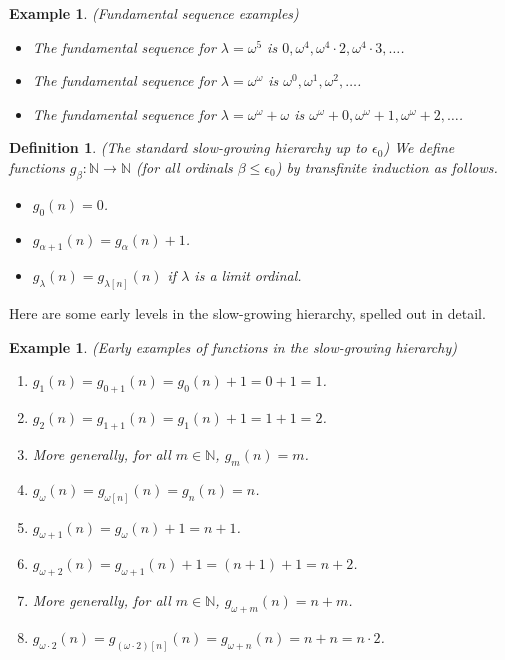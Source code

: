 \documentclass{article}
\newtheorem{definition}[theorem]{Definition}
\newtheorem{example}[theorem]{Example}
\begin{document}
\begin{example}
    (Fundamental sequence examples)
    \begin{itemize}
        \item
        The fundamental sequence for $\lambda=\omega^5$ is
        $0,\omega^4,\omega^4\cdot 2,\omega^4\cdot 3,\ldots$.
        \item
        The fundamental sequence for $\lambda=\omega^\omega$ is
        $\omega^0,\omega^1,\omega^2,\ldots$.
        \item
        The fundamental sequence for $\lambda=\omega^\omega+\omega$ is
        $\omega^\omega+0,\omega^\omega+1,\omega^\omega+2,\ldots$.
    \end{itemize}
\end{example}

\begin{definition}
\label{slowgrowinghierarchydefn}
    (The standard slow-growing hierarchy up to $\epsilon_0$)
    We define functions $g_\beta:\mathbb N\to\mathbb N$ (for all ordinals
    $\beta\leq \epsilon_0$) by transfinite induction as follows.
    \begin{itemize}
        \item
        $g_0(n)=0$.
        \item
        $g_{\alpha+1}(n) = g_\alpha(n) + 1$.
        \item
        $g_{\lambda}(n) = g_{\lambda[n]}(n)$ if $\lambda$ is a limit ordinal.
    \end{itemize}
\end{definition}

Here are some early levels in the slow-growing hierarchy, spelled out in detail.

\begin{example}
\label{highdetailslowgrowingexample}
    (Early examples of functions in the slow-growing hierarchy)
    \begin{enumerate}
        \item
        $g_1(n)=g_{0+1}(n)=g_0(n)+1=0+1=1$.
        \item
        $g_2(n)=g_{1+1}(n)=g_1(n)+1=1+1=2$.
        \item
        More generally, for all $m\in\mathbb N$,
        $g_m(n)=m$.
        \item
        $g_\omega(n)=g_{\omega[n]}(n)=g_n(n)=n$.
        \item
        $g_{\omega+1}(n)=g_{\omega}(n)+1=n+1$.
        \item
        $g_{\omega+2}(n)=g_{\omega+1}(n)+1=(n+1)+1=n+2$.
        \item
        More generally, for all $m\in\mathbb N$,
        $g_{\omega+m}(n)=n+m$.
        \item
        $g_{\omega\cdot 2}(n)=g_{(\omega\cdot 2)[n]}(n)
        =g_{\omega+n}(n)=n+n=n\cdot 2$.
    \end{enumerate}
\end{example}
\end{document}
